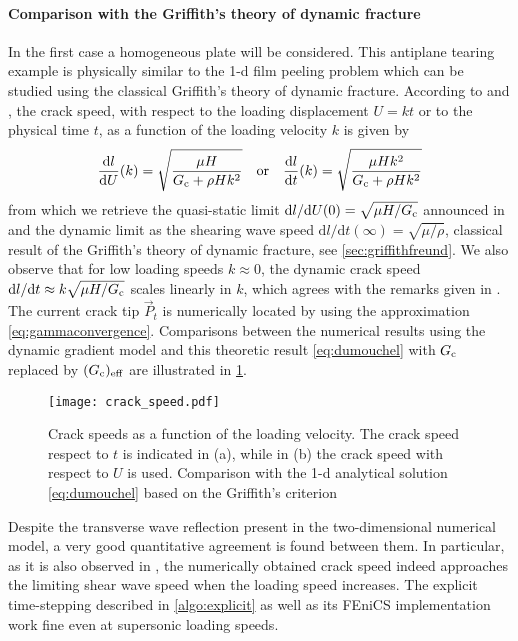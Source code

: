 \paragraph{Comparison with the Griffith's theory of dynamic fracture} In the first case a homogeneous plate will be considered. This antiplane tearing example is physically similar to the 1-d film peeling problem which can be studied using the classical Griffith's theory of dynamic fracture. According to \cite{DumouchelMarigoCharlotte:2008} and \cite{BourdinFrancfortMarigo:2008}, the crack speed, with respect to the loading displacement $U=kt$ or to the physical time $t$, as a function of the loading velocity $k$ is given by
\begin{equation} \label{eq:dumouchel}
\frac{\mathrm{d} l}{\mathrm{d} U}(k)=\sqrt{\frac{\mu H}{G_\mathrm{c}+\rho Hk^2}}\quad\text{or}\quad\frac{\mathrm{d} l}{\mathrm{d} t}(k)=\sqrt{\frac{\mu Hk^2}{G_\mathrm{c}+\rho Hk^2}}
\end{equation}
from which we retrieve the quasi-static limit $\mathrm{d} l/\mathrm{d} U(0)=\sqrt{\mu H/G_\mathrm{c}}$ announced in \cite{BourdinFrancfortMarigo:2008} and the dynamic limit as the shearing wave speed $\mathrm{d} l/\mathrm{d} t(\infty)=\sqrt{\mu/\rho}$, classical result of the Griffith's theory of dynamic fracture, see \cref{sec:griffithfreund}. We also observe that for low loading speeds $k\approx 0$, the dynamic crack speed $\mathrm{d} l/\mathrm{d} t\approx k\sqrt{\mu H/G_\mathrm{c}}$ scales linearly in $k$, which agrees with the remarks given in \cite{Bourdin:2011}. The current crack tip $\vec{P}_t$ is numerically located by using the approximation \eqref{eq:gammaconvergence}. Comparisons between the numerical results using the dynamic gradient model and this theoretic result \eqref{eq:dumouchel} with $G_\mathrm{c}$ replaced by $(G_\mathrm{c})_\mathrm{eff}$ are illustrated in \cref{fig:mode3}.
\begin{figure}[htbp]
\centering
\texttt{[image: crack\_speed.pdf]}
\caption{Crack speeds as a function of the loading velocity. The crack speed respect to $t$ is indicated in (a), while in (b) the crack speed with respect to $U$ is used. Comparison with the 1-d analytical solution \eqref{eq:dumouchel} based on the Griffith's criterion} \label{fig:mode3}
\end{figure}
Despite the transverse wave reflection present in the two-dimensional numerical model, a very good quantitative agreement is found between them. In particular, as it is also observed in \cite{Bourdin:2011}, the numerically obtained crack speed indeed approaches the limiting shear wave speed when the loading speed increases. The explicit time-stepping described in \cref{algo:explicit} as well as its FEniCS implementation work fine even at supersonic loading speeds.

